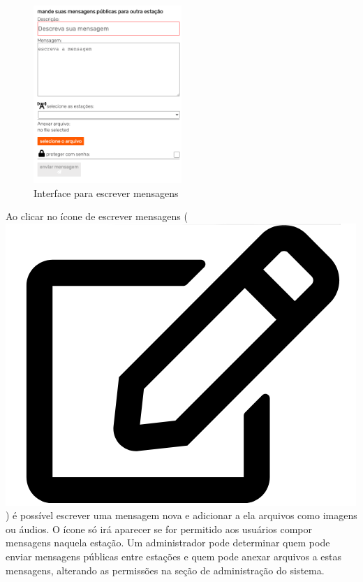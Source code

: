 \documentclass[11pt,a4paper]{article}
\begin{document}
\begin{figure}[H]
    \centering
    \includegraphics[width=0.5\textwidth]{screenshots/frontend/pt_kn/compose.png}
    \caption{Interface para escrever mensagens}
    \label{fig:compose}
\end{figure}
Ao clicar no ícone de escrever mensagens (\includegraphics[height=0.8\baselineskip]{pictures/edit.png}) é possível escrever uma mensagem nova e adicionar a ela arquivos como imagens ou áudios. O ícone só irá aparecer se for permitido aos usuários compor mensagens naquela estação. Um administrador pode determinar quem pode enviar mensagens públicas entre estações e quem pode anexar arquivos a estas mensagens, alterando as permissões na seção de administração do sistema.


\end{document}
